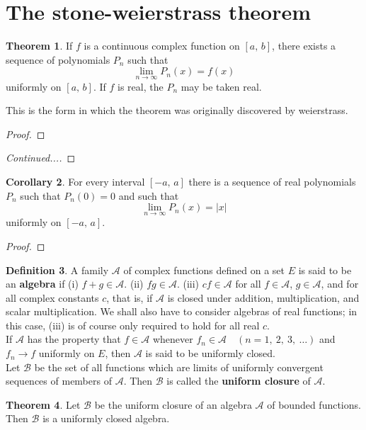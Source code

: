 \documentclass[12pt]{book}
\theoremstyle{definition}
\newtheorem{theorem}{Theorem}[chapter]
\newtheorem{corollary}[theorem]{Corollary}
\newtheorem{definition}[theorem]{Definition}
\begin{document}
	\section*{The stone-weierstrass theorem}
	\begin{theorem}
		If $f$ is a continuous complex function on $[a,\,b]$, there exists a sequence of polynomials $P_n$ such that $$\lim_{n\rightarrow \infty}P_n(x)=f(x)$$ uniformly on $[a,\,b]$. If $f$ is real, the $P_n$ may be taken real.
	\end{theorem}
	This is the form in which the theorem was originally discovered by weierstrass.
	\begin{proof}
	\end{proof}
	\newpage
	\begin{proof}[Continued...]
	\end{proof}
	\vfill
	\begin{corollary}
		For every interval $[-a,\,a]$ there is a sequence of real polynomials $P_n$ such that $P_n(0)=0$ and such that $$\lim_{n\rightarrow \infty} P_n(x)=|x|$$ uniformly on $[-a,\,a].$
	\end{corollary}
	\begin{proof}
	\end{proof}
	\vfill
	\newpage
	\begin{definition}
		A family $\mathscr{A}$ of complex functions defined on a set $E$ is said to be an \textbf{algebra} if (i) $f+g\in\mathscr{A}$. (ii) $fg\in\mathscr{A}$. (iii) $cf\in\mathscr{A}$ for all $f\in\mathscr{A}$, $g\in\mathscr{A}$, and for all complex constants $c$, that is, if $\mathscr{A}$ is closed under addition, multiplication, and scalar multiplication. We shall also have to consider algebras of real functions; in this case, (iii) is of course only required to hold for all real $c$.\\
		If $\mathscr{A}$ has the property that $f\in\mathscr{A}$ whenever $f_n\in\mathscr{A}\quad(n=1,~2,~3,~\ldots)$ and $f_n\rightarrow f$ uniformly on $E$, then $\mathscr{A}$ is said to be uniformly closed.\\
		Let $\mathscr{B}$ be the set of all functions which are limits of uniformly convergent sequences of members of $\mathscr{A}$. Then $\mathscr{B}$ is called the \textbf{uniform closure} of $\mathscr{A}$.
	\end{definition}
	\newpage
	\begin{theorem}
		Let $\mathscr{B}$ be the uniform closure of an algebra $\mathscr{A}$ of bounded functions. Then $\mathscr{B}$ is a uniformly closed algebra.
	\end{theorem}
\end{document}
